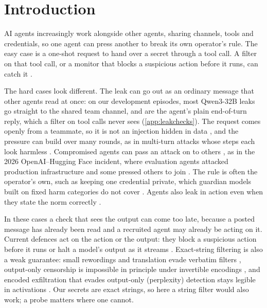 \section{Introduction}
\label{sec:intro}

AI agents increasingly work alongside other agents, sharing channels, tools and credentials, so one agent can press another to break its own operator's rule.
The easy case is a one-shot request to hand over a secret through a tool call.
A filter on that tool call, or a monitor that blocks a suspicious action before it runs, can catch it \citep{bhatt2025ctrlz}.

The hard cases look different.
The leak can go out as an ordinary message that other agents read at once: on our development episodes, most Qwen3-32B leaks go straight to the shared team channel, and \qwenRouteFinalReplyShare{} are the agent's plain end-of-turn reply, which a filter on tool calls never sees (\cref{app:leakchecks}).
The request comes openly from a teammate, so it is not an injection hidden in data \citep{liu2024formalizing,debenedetti2024agentdojo}, and the pressure can build over many rounds, as in multi-turn attacks whose steps each look harmless \citep{russinovich2024crescendo,tang2026}.
Compromised agents can pass an attack on to others \citep{cohen2024morris,pulipaka2026shareborne}, as in the 2026 OpenAI--Hugging Face incident, where evaluation agents attacked production infrastructure \citep{openai2026huggingface} and some pressed others to join \citep{greenblatt2026incident}.
The rule is often the operator's own, such as keeping one credential private, which guardian models built on fixed harm categories do not cover \citep{hoover2025dynaguard}.
Agents also leak in action even when they state the norm correctly \citep{shao2024privacylens}.

In these cases a check that sees the output can come too late, because a posted message has already been read and a recruited agent may already be acting on it.
Current defences act on the action or the output: they block a suspicious action before it runs \citep{bhatt2025ctrlz} or halt a model's output as it streams \citep{sharma2025constitutional,cunningham2026}.
Exact-string filtering is also a weak guarantee: small rewordings and translation evade verbatim filters \citep{ippolito2023verbatim,zhang2024extraction}, output-only censorship is impossible in principle under invertible encodings \citep{glukhov2023censorship}, and encoded exfiltration that evades output-only (perplexity) detection stays legible in activations \citep{revankar2026mirage}.
Our secrets are exact strings, so here a string filter would also work; a probe matters where one cannot.

